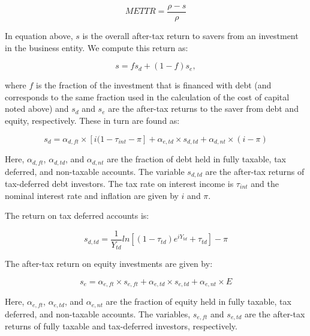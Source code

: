 \documentclass[article,11pt,letterpaper,fleqn]{article}
\theoremstyle{definition}
\numberwithin{equation}{section}
\begin{document}
\begin{equation}
METTR = \frac{\rho-s}{\rho}
\end{equation}

\noindent\noindent In equation above, $s$ is the overall after-tax return to savers from an investment in the business entity.  We compute this return as:

\begin{equation}
s = fs_{d} + (1-f)s_{e},
\end{equation}

\noindent\noindent where $f$ is the fraction of the investment that is financed with debt (and corresponds to the same fraction used in the calculation of the cost of capital noted above) and $s_{d}$ and $s_{e}$ are the after-tax returns to the saver from debt and equity, respectively.  These in turn are found as:

\begin{equation}
s_{d} = \alpha_{d,ft}\times \left[i(1-\tau_{int}-\pi\right] + \alpha_{e,td}\times s_{d,td} + \alpha_{d,nt}\times (i-\pi)
\end{equation}

Here, $\alpha_{d,ft}$, $\alpha_{d,td}$, and $\alpha_{d,nt}$ are the fraction of debt held in fully taxable, tax deferred, and non-taxable accounts.  The variable $s_{d,td}$ are the after-tax returns of tax-deferred debt investors.  The tax rate on interest income is $\tau_{int}$ and the nominal interest rate and inflation are given by $i$ and $\pi$.


 The return on tax deferred accounts is:
 
 \begin{equation}
s_{d,td} = \frac{1}{Y_{td}}ln \left[(1-\tau_{td})e^{iY_{td}}+\tau_{td}\right]-\pi
\end{equation}


The after-tax return on equity investments are given by:

\begin{equation}
s_{e} = \alpha_{e,ft}\times s_{e,ft} + \alpha_{e,td}\times s_{e,td} + \alpha_{e,nt}\times E
\end{equation}

 

Here, $\alpha_{e,ft}$, $\alpha_{e,td}$, and $\alpha_{e,nt}$ are the fraction of equity held in fully taxable, tax deferred, and non-taxable accounts.  The variables, $s_{e,ft}$ and $s_{e,td}$ are the after-tax returns of fully taxable and tax-deferred investors, respectively.  
\end{document}
